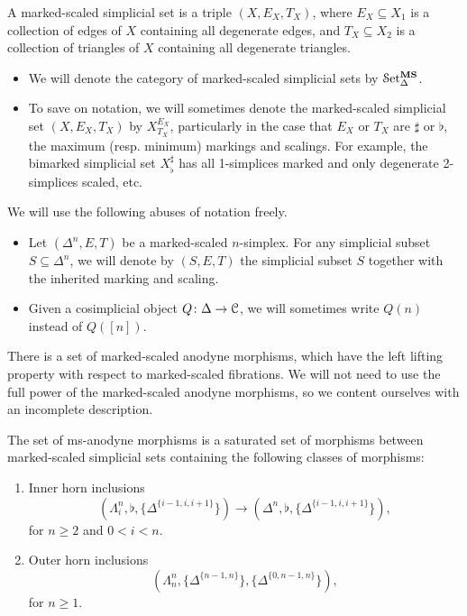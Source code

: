 \documentclass[main.tex]{subfiles}
\begin{document}
A marked-scaled simplicial set is a triple $(X, E_{X}, T_{X})$, where $E_{X} \subseteq X_{1}$ is a collection of edges of $X$ containing all degenerate edges, and $T_{X} \subseteq X_{2}$ is a collection of triangles of $X$ containing all degenerate triangles.
\begin{itemize}
  \item We will denote the category of marked-scaled simplicial sets by $\mathcal{S}\mathrm{et}_{\Delta}^{\mathbf{MS}}$.

  \item To save on notation, we will sometimes denote the marked-scaled simplicial set $(X, E_{X}, T_{X})$ by $X^{E_{X}}_{T_{X}}$, particularly in the case that $E_{X}$ or $T_{X}$ are $\sharp$ or $\flat$, the maximum (resp. minimum) markings and scalings. For example, the bimarked simplicial set $X^{\sharp}_{\flat}$ has all 1-simplices marked and only degenerate 2-simplices scaled, etc.
\end{itemize}

We will use the following abuses of notation freely.

\begin{itemize}
  \item Let $(\Delta^{n}, E, T)$ be a marked-scaled $n$-simplex. For any simplicial subset $S \subseteq \Delta^{n}$, we will denote by $(S, E, T)$ the simplicial subset $S$ together with the inherited marking and scaling.
        
  \item Given a cosimplicial object $Q\colon \Delta \to \mathcal{C}$, we will sometimes write $Q(n)$ instead of $Q([n])$.
\end{itemize}

There is a set of marked-scaled anodyne morphisms, which have the left lifting property with respect to marked-scaled fibrations. We will not need to use the full power of the marked-scaled anodyne morphisms, so we content ourselves with an incomplete description.

\begin{definition}
  \label{def:ms-anodyne_morphisms}
  The set of ms-anodyne morphisms is a saturated set of morphisms between marked-scaled simplicial sets containing the following classes of morphisms:
  \begin{enumerate}[label=(A\arabic*)]
    \item\label{item:innerms} Inner horn inclusions
      \begin{equation*}
        (\Lambda^{n}_{i}, \flat, \{\Delta^{\{i-1,i,i+1\}}\}) \to (\Delta^{n}, \flat, \{\Delta^{\{i-1,i,i+1\}}\}),
      \end{equation*}
      for $n \geq 2$ and $0 < i < n$.

    \item\label{item:outerms} Outer horn inclusions
      \begin{equation*}
        (\Lambda^{n}_{n}, \{\Delta^{\{n-1,n\}}\}, \{\Delta^{\{0, n-1, n\}}\}),
      \end{equation*}
      for $n \geq 1$.
  \end{enumerate}
\end{definition}
\end{document}
